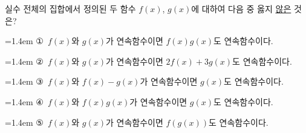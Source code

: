 실수 전체의 집합에서 정의된 두 함수 $f(x)$, $g(x)$에 대하여 다음 중 옳지 \underline{않은} 것은?
\par\medskip\par\noindent\hangindent=1.4em {\small ①}\ $f(x)$와 $g(x)$가 연속함수이면 $f(x)g(x)$도 연속함수이다.\par\noindent\hangindent=1.4em {\small ②}\ $f(x)$와 $g(x)$가 연속함수이면 $2f(x)+3g(x)$도 연속함수이다.\par\noindent\hangindent=1.4em {\small ③}\ $f(x)$와 $f(x)-g(x)$가 연속함수이면 $g(x)$도 연속함수이다.\par\noindent\hangindent=1.4em {\small ④}\ $f(x)$와 $f(x)g(x)$가 연속함수이면 $g(x)$도 연속함수이다.\par\noindent\hangindent=1.4em {\small ⑤}\ $f(x)$와 $g(x)$가 연속함수이면 $f(g(x))$도 연속함수이다.\par\medskip
